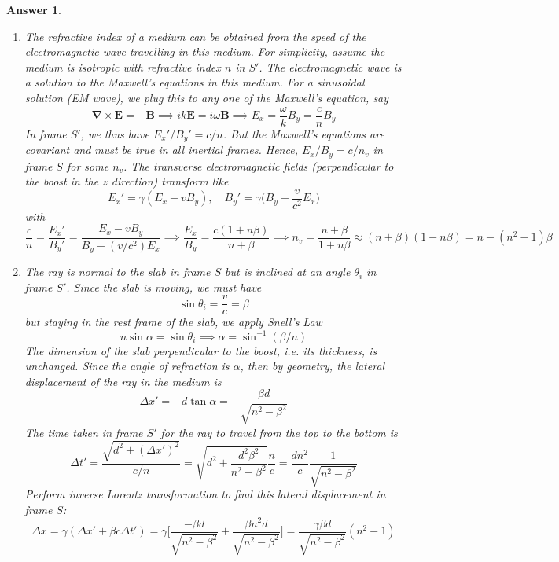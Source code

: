 \documentclass[a4paper]{article}
\newtheorem{ans}{Answer}
\theoremstyle{new}
\begin{document}
\begin{ans}\leavevmode
\begin{enumerate}[label=(\roman*)]
\item The refractive index of a medium can be obtained from the speed of the electromagnetic wave travelling in this medium. For simplicity, assume the medium is isotropic with refractive index $n$ in $S'$. The electromagnetic wave is a solution to the Maxwell's equations in this medium. For a sinusoidal solution (EM wave), we plug this to any one of the Maxwell's equation, say
$$\boldsymbol{\nabla}\times\mathbf{E}=-\mathbf{\dot{B}}\implies ik\mathbf{E}=i\omega\mathbf{B}\implies E_x=\frac{\omega}{k}B_y=\frac{c}{n}B_y$$
In frame $S'$, we thus have $E_x'/B_y'=c/n$. But the Maxwell's equations are covariant and must be true in all inertial frames. Hence, $E_x/B_y=c/n_v$ in frame $S$ for some $n_v$. The transverse electromagnetic fields (perpendicular to the boost in the $z$ direction) transform like
$$E_x'=\gamma(E_x-vB_y),\quad B_y'=\gamma\bigg(B_y-\frac{v}{c^2}E_x\bigg)$$
with
$$\frac{c}{n}=\frac{E_x'}{B_y'}=\frac{E_x-vB_y}{B_y-(v/c^2)E_x}\implies\frac{E_x}{B_y}=\frac{c(1+n\beta)}{n+\beta}\implies n_v=\frac{n+\beta}{1+n\beta}\approx(n+\beta)(1-n\beta)=n-(n^2-1)\beta$$
\item The ray is normal to the slab in frame $S$ but is inclined at an angle $\theta_i$ in frame $S'$. Since the slab is moving, we must have
$$\sin\theta_i=\frac{v}{c}=\beta$$
but staying in the rest frame of the slab, we apply Snell's Law
$$n\sin\alpha=\sin\theta_i\implies\alpha=\sin^{-1}(\beta/n)$$
The dimension of the slab perpendicular to the boost, i.e. its thickness, is unchanged. Since the angle of refraction is $\alpha$, then by geometry, the lateral displacement of the ray in the medium is
$$\Delta x'=-d\tan\alpha=-\frac{\beta d}{\sqrt{n^2-\beta^2}}$$
The time taken in frame $S'$ for the ray to travel from the top to the bottom is
$$\Delta t'=\frac{\sqrt{d^2+(\Delta x')^2}}{c/n}=\sqrt{d^2+\frac{d^2\beta^2}{n^2-\beta^2}}\frac{n}{c}=\frac{dn^2}{c}\frac{1}{\sqrt{n^2-\beta^2}}$$
Perform inverse Lorentz transformation to find this lateral displacement in frame $S$:
$$\Delta x=\gamma(\Delta x'+\beta c\Delta t')=\gamma\bigg[\frac{-\beta d}{\sqrt{n^2-\beta^2}}+\frac{\beta n^2d}{\sqrt{n^2-\beta^2}}\bigg]=\frac{\gamma\beta d}{\sqrt{n^2-\beta^2}}(n^2-1)$$
\end{enumerate}
\end{ans}
\newpage
\end{document}
